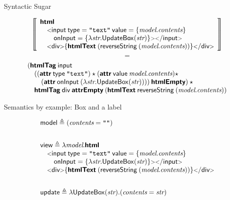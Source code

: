 \documentclass[11.5pt, aspectratio=169]{beamer}
\begin{document}
\begin{frame}{Syntactic Sugar}

    \[
      \left\llbracket
    \begin{array}{l}
      \calcwd{html} \\
      \quad \opentag{input} \: \attribute{type}=\textnode{"text"} \:
      \attribute{value} = \{ \var{model}.\var{contents} \} \\
      \qquad
        \attribute{onInput} = \{ \lambda \textit{str}.
          \mkwd{UpdateBox}(\textit{str})\} \closetag \tagzeroend{input}  \\
        \quad \htmltagzero{div}{\antiquote{\htmltext{(\metadef{reverseString} \:
        (\textit{model}. \textit{contents}))}}}
    \end{array}
    \right\rrbracket
  \]%
  \vspace{0.25em}
  {\Huge
  \[
    =
  \]%
}
  \[
    \begin{array}{l}
        (\textbf{\textsf{htmlTag}} \: \textsf{input} \\
        \quad ((\textbf{\textsf{attr}} \: \mathsf{type} \: \texttt{"text"}) \star
        (\textbf{\textsf{attr}} \: \mathsf{value} \: \textit{model}.\textit{contents}) \star \\
         \qquad
         (\textbf{\textsf{attr}} \: \mathsf{onInput} \: (\lambda \textit{str}.
         \mathsf{UpdateBox}(\textit{str})))) \: \textbf{\textsf{htmlEmpty}}) \: \star \\
         \quad
         \textbf{\textsf{htmlTag}} \: \textsf{div} \: \textbf{\textsf{attrEmpty}} \: (\textbf{\textsf{htmlText}} \: \mathsf{reverseString} \:
         (\textit{model}.\textit{contents}))
    \end{array}
  \]
\end{frame}

\begin{frame}{Semantics by example: Box and a label}

  \large
\[
      \bl
      \mkwd{model} \defeq (\var{contents} = \textnode{""}) \vspace{2em} \\
      \mkwd{view} \defeq \lambda \textit{model} . \calcwd{html} \\
      \quad \opentag{input} \: \attribute{type}=\textnode{"text"} \:
      \attribute{value} = \{ \var{model}.\var{contents} \} \\
      \qquad
        \attribute{onInput} = \{ \lambda \textit{str}.
          \mkwd{UpdateBox}(\textit{str})\} \closetag \tagzeroend{input}  \\
        \quad \htmltagzero{div}{\antiquote{\htmltext{(\metadef{reverseString} \:
        (\textit{model}. \textit{contents}))}}} \vspace{2em} \\
        \mkwd{update} \defeq \lambda \mkwd{UpdateBox}(\var{str}) . (\var{contents} = \var{str})
      \el
    \]
\end{frame}
\end{document}

